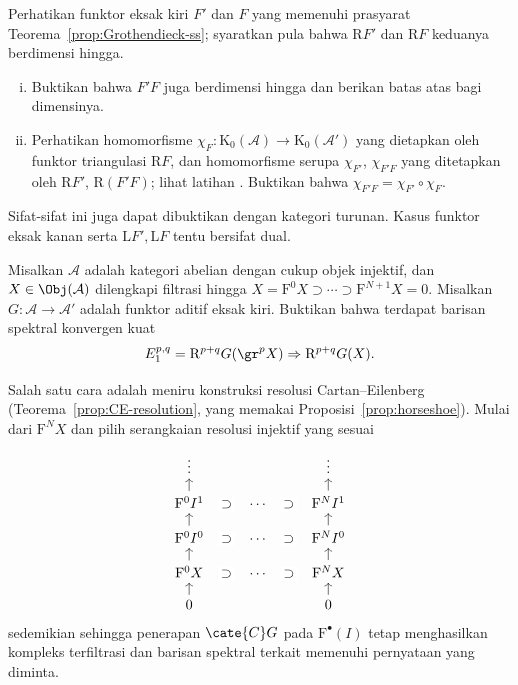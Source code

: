 \begin{Exercises}
	\item Perhatikan funktor eksak kiri $F'$ dan $F$ yang memenuhi prasyarat
	Teorema~\ref{prop:Grothendieck-ss}; syaratkan pula bahwa $\mathrm{R}F'$ dan
	$\mathrm{R}F$ keduanya berdimensi hingga.
	\begin{enumerate}[(i)]
		\item Buktikan bahwa $F'F$ juga berdimensi hingga dan berikan batas atas
		bagi dimensinya.
		\item Perhatikan homomorfisme
		$\chi_F:\mathrm{K}_0(\mathcal{A})\to\mathrm{K}_0(\mathcal{A}')$ yang
		dietapkan oleh funktor triangulasi $\mathrm{R}F$, dan homomorfisme
		serupa $\chi_{F'}$, $\chi_{F'F}$ yang ditetapkan oleh $\mathrm{R}F'$,
		$\mathrm{R}(F'F)$; lihat latihan . Buktikan bahwa
		$\chi_{F'F}=\chi_{F'}\circ\chi_F$.
	\end{enumerate}
	Sifat-sifat ini juga dapat dibuktikan dengan kategori turunan. Kasus funktor
	eksak kanan serta $\mathrm{L}F',\mathrm{L}F$ tentu bersifat dual.

	\item Misalkan $\mathcal{A}$ adalah kategori abelian dengan cukup objek
	injektif, dan $X\in\Obj(\mathcal{A})$ dilengkapi filtrasi hingga
	$X=\mathrm{F}^0X\supset\cdots\supset\mathrm{F}^{N+1}X=0$. Misalkan
	$G:\mathcal{A}\to\mathcal{A}'$ adalah funktor aditif eksak kiri. Buktikan
	bahwa terdapat barisan spektral konvergen kuat
	\[ E_1^{p,q}=\mathrm{R}^{p+q}G(\gr^pX)
	\Rightarrow\mathrm{R}^{p+q}G(X). \]
	\begin{hint}
		Salah satu cara adalah meniru konstruksi resolusi Cartan--Eilenberg
		(Teorema~\ref{prop:CE-resolution}, yang memakai
		Proposisi~\ref{prop:horseshoe}). Mulai dari $\mathrm{F}^NX$ dan pilih
		serangkaian resolusi injektif yang sesuai
		\[\begin{tikzcd}[row sep=small]
			\vdots & & \vdots \\
			\mathrm{F}^0I^1 \arrow[u]
			\arrow[phantom,r,"\supset" description] & \cdots
			\arrow[phantom,r,"\supset" description] & \mathrm{F}^NI^1 \arrow[u] \\
			\mathrm{F}^0I^0 \arrow[u]
			\arrow[phantom,r,"\supset" description] & \cdots
			\arrow[phantom,r,"\supset" description] & \mathrm{F}^NI^0 \arrow[u] \\
			\mathrm{F}^0X \arrow[u]
			\arrow[phantom,r,"\supset" description] & \cdots
			\arrow[phantom,r,"\supset" description] & \mathrm{F}^NX \arrow[u] \\
			0 \arrow[u] & & 0 \arrow[u]
		\end{tikzcd}\]
		sedemikian sehingga penerapan $\cate{C}G$ pada
		$\mathrm{F}^\bullet(I)$ tetap menghasilkan kompleks terfiltrasi dan
		barisan spektral terkait memenuhi pernyataan yang diminta.
	\end{hint}


\end{Exercises}
